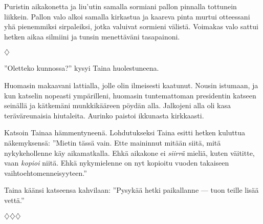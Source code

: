 ﻿\documentclass[a4paper, 12pt, finnish]{article}
\newcommand{\q}[1]{''#1''}
\def\jump{\vspace{2mm} \centerline{$\diamondsuit$} \vspace{2mm}}
\def\endjump{\vspace{2mm} \centerline{$\diamondsuit\diamondsuit\diamondsuit$} \vspace{2mm}}
\begin{document}
Puristin aikakonetta ja liu'utin samalla sormiani pallon pinnalla
tottunein liikkein. Pallon valo alkoi samalla kirkastua ja kaareva
pinta murtui otteessani yhä pienemmiksi sirpaleiksi,
jotka valuivat sormieni välistä. Voimakas valo sattui hetken aikaa
silmiini ja tunsin menettäväni tasapainoni.


\jump


\q{Oletteko kunnossa?} kysyi Taina huolestuneena.

Huomasin makaavani
lattialla, jolle olin ilmeisesti kaatunut. Nousin istumaan, ja
kun katselin nopeasti ympärilleni, huomasin tuntemattoman
presidentin katseen seinällä ja kätkemäni munkkikääreen pöydän alla.
Jalkojeni alla oli kasa teräväreunaisia hiutaleita.
Aurinko paistoi ikkunasta kirkkaasti.

Katsoin Tainaa hämmentyneenä. Lohdutukseksi Taina esitti hetken
kuluttua näkemyksensä: \q{Mietin tässä vain.
Ette maininnut mitään siitä, mitä nykykehollenne käy aikamatkalla.
Ehkä aikakone ei \emph{siirrä} mieliä, kuten väititte,
vaan \emph{kopioi} niitä. Ehkä nykymielenne on nyt kopioitu
vuoden takaiseen vaihtoehtomenneisyyteen.}

Taina käänsi katseensa kahvilaan:
\q{Pysykää hetki paikallanne --- tuon teille lisää vettä.}


\endjump
\end{document}
